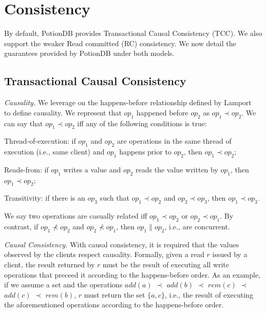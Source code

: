 \documentclass[sigplan,10pt]{acmart}
\begin{document}
\section{{Consistency}}
\label{sec:consistency}

By default, PotionDB provides Transactional Causal Consistency (TCC).
We also support the weaker Read committed (RC) consistency. %
We now detail the guarantees provided by PotionDB under both models.

\subsection{Transactional Causal Consistency}
\label{subsec:transactionalcausal}

\emph{Causality.} 
We leverage on the happens-before relationship defined by Lamport~\cite{lamport78} to define causality.
We represent that $op_1$ happened before $op_2$ as $op_1 \prec op_2$.
We can say that $op_1 \prec op_2$ iff any of the following conditions is true:

\begin{compactitem}
	\item Thread-of-execution: if $op_1$ and $op_2$ are operations in the same thread of execution (i.e., same client) and $op_1$ happens prior to $op_2$, then $op_1 \prec op_2$;
	\item Reads-from: if $op_1$ writes a value and $op_2$ reads the value written by $op_1$, then $op_1 \prec op_2$;
	\item Transitivity: if there is an $op_3$ such that $op_1 \prec op_2$ and $op_2 \prec op_3$, then $op_1 \prec op_3$.
\end{compactitem} 

We say two operations are casually related iff $op_1 \prec op_2$ or $op_2 \prec op_1$.
By contrast, if $op_1 \nprec op_2$ and $op_2 \nprec op_1$, then $op_1 \parallel op_2$, i.e., are concurrent.

\emph{Causal Consistency.}
With causal consistency, it is required that the values observed by the clients respect causality.
Formally, given a read $r$ issued by a client, the result returned by $r$ must be the result of executing all write operations that preceed it according to the happens-before order.
As an example, if we assume a set and the operations $add(a)$ $\prec$ $add(b)$ $\prec$ $rem(c)$ $\prec$ $add(c)$ $\prec$ $rem(b)$, $r$ must return the set $\{a, c\}$, i.e., the result of executing the aforementioned operations according to the happens-before order.
\end{document}
